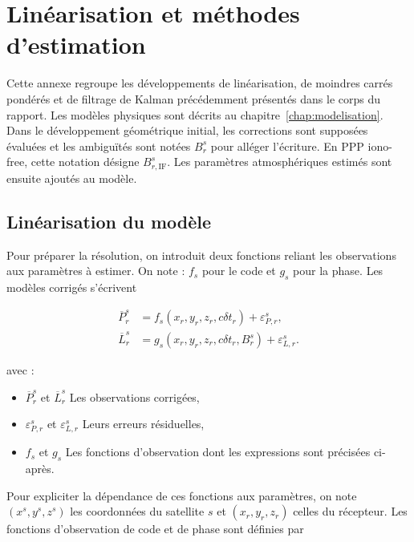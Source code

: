 \chapter{Linéarisation et méthodes d'estimation}
\label{ann:estimation}
\label{annexB}

Cette annexe regroupe les développements de linéarisation, de moindres carrés
pondérés et de filtrage de Kalman précédemment présentés dans le corps du
rapport. Les modèles physiques sont décrits au chapitre~\ref{chap:modelisation}.
Dans le développement géométrique initial, les corrections sont supposées
évaluées et les ambiguïtés sont notées $B_r^s$ pour alléger l'écriture.
En PPP iono-free, cette notation désigne $B_{r,\mathrm{IF}}^s$.
Les paramètres atmosphériques estimés sont ensuite ajoutés au modèle.

\section{Linéarisation du modèle}
\label{ann:resolution}

Pour préparer la résolution, on introduit deux fonctions reliant les observations aux paramètres à estimer. On note :
$f_s$ pour le code et $g_s$ pour la phase. Les
modèles corrigés s'écrivent

\begin{align}
\overline P_r^s
&=f_s(x_r,y_r,z_r,c\delta t_r)+\varepsilon_{P,r}^s,
\\
\overline L_r^s
&=g_s(x_r,y_r,z_r,c\delta t_r,B_r^s)+\varepsilon_{L,r}^s.
\label{ann:eq:explicit_observation_functions}
\end{align}

avec :

\begin{itemize}
    \item $\overline P_r^s$ et $\overline L_r^s$ Les observations corrigées,
    \item $\varepsilon_{P,r}^s$ et $\varepsilon_{L,r}^s$ Leurs erreurs
    résiduelles,
    \item $f_s$ et $g_s$ Les fonctions d'observation dont les expressions
    sont précisées ci-après.
\end{itemize}


Pour expliciter la dépendance de ces fonctions aux paramètres, on note
$(x^s,y^s,z^s)$ les coordonnées du satellite $s$ et
$(x_r,y_r,z_r)$ celles du récepteur. Les fonctions d'observation de code et de
phase sont définies par

